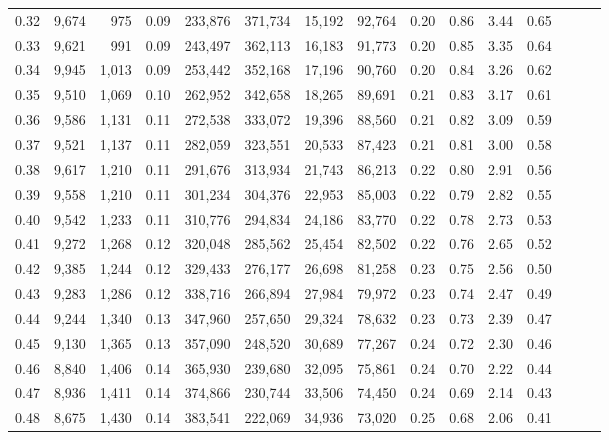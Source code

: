 \begin{tabular}{rrrrrrrrrrrrrrr}
0.32 &   9,674 &    975 &  0.09 &  233,876 &  371,734 &   15,192 &   92,764 &  0.20 &  0.86 &  3.44 &      0.65 \\
0.33 &   9,621 &    991 &  0.09 &  243,497 &  362,113 &   16,183 &   91,773 &  0.20 &  0.85 &  3.35 &      0.64 \\
0.34 &   9,945 &  1,013 &  0.09 &  253,442 &  352,168 &   17,196 &   90,760 &  0.20 &  0.84 &  3.26 &      0.62 \\
0.35 &   9,510 &  1,069 &  0.10 &  262,952 &  342,658 &   18,265 &   89,691 &  0.21 &  0.83 &  3.17 &      0.61 \\
0.36 &   9,586 &  1,131 &  0.11 &  272,538 &  333,072 &   19,396 &   88,560 &  0.21 &  0.82 &  3.09 &      0.59 \\
0.37 &   9,521 &  1,137 &  0.11 &  282,059 &  323,551 &   20,533 &   87,423 &  0.21 &  0.81 &  3.00 &      0.58 \\
0.38 &   9,617 &  1,210 &  0.11 &  291,676 &  313,934 &   21,743 &   86,213 &  0.22 &  0.80 &  2.91 &      0.56 \\
0.39 &   9,558 &  1,210 &  0.11 &  301,234 &  304,376 &   22,953 &   85,003 &  0.22 &  0.79 &  2.82 &      0.55 \\
0.40 &   9,542 &  1,233 &  0.11 &  310,776 &  294,834 &   24,186 &   83,770 &  0.22 &  0.78 &  2.73 &      0.53 \\
0.41 &   9,272 &  1,268 &  0.12 &  320,048 &  285,562 &   25,454 &   82,502 &  0.22 &  0.76 &  2.65 &      0.52 \\
0.42 &   9,385 &  1,244 &  0.12 &  329,433 &  276,177 &   26,698 &   81,258 &  0.23 &  0.75 &  2.56 &      0.50 \\
0.43 &   9,283 &  1,286 &  0.12 &  338,716 &  266,894 &   27,984 &   79,972 &  0.23 &  0.74 &  2.47 &      0.49 \\
0.44 &   9,244 &  1,340 &  0.13 &  347,960 &  257,650 &   29,324 &   78,632 &  0.23 &  0.73 &  2.39 &      0.47 \\
0.45 &   9,130 &  1,365 &  0.13 &  357,090 &  248,520 &   30,689 &   77,267 &  0.24 &  0.72 &  2.30 &      0.46 \\
0.46 &   8,840 &  1,406 &  0.14 &  365,930 &  239,680 &   32,095 &   75,861 &  0.24 &  0.70 &  2.22 &      0.44 \\
0.47 &   8,936 &  1,411 &  0.14 &  374,866 &  230,744 &   33,506 &   74,450 &  0.24 &  0.69 &  2.14 &      0.43 \\
0.48 &   8,675 &  1,430 &  0.14 &  383,541 &  222,069 &   34,936 &   73,020 &  0.25 &  0.68 &  2.06 &      0.41 \\

\end{tabular}
